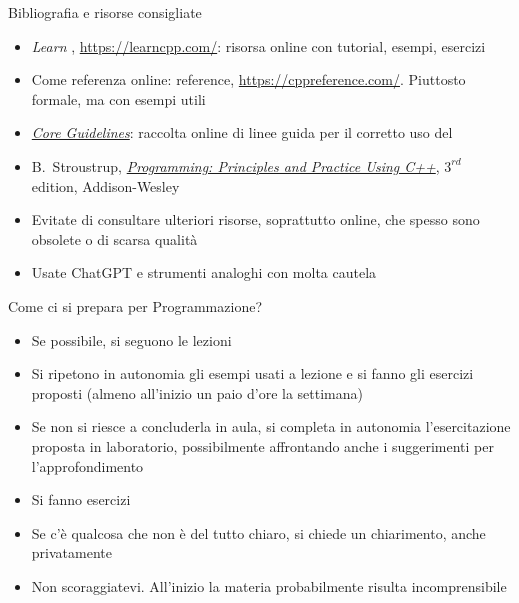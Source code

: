 \begin{frame}{Bibliografia e risorse consigliate}

  \begin{itemize}

  \item \textit{Learn \Cpp{}}, \url{https://learncpp.com/}: risorsa online con
    tutorial, esempi, esercizi

  \item Come referenza online: \Cpp{} reference,
    \url{https://cppreference.com/}. Piuttosto formale, ma con esempi utili

  \item
    \href{https://isocpp.github.io/CppCoreGuidelines/CppCoreGuidelines}{\textit{\Cpp{}
        Core Guidelines}}: raccolta online di linee guida per il corretto uso
    del \Cpp{}

  \item B.~Stroustrup,
    \href{https://stroustrup.com/programming.html}{\textit{Programming:
        Principles and Practice Using C++}}, $3^{rd}$ edition, Addison-Wesley

  \end{itemize}

  \begin{itemize}
  \item Evitate di consultare ulteriori risorse, soprattutto online, che spesso
    sono obsolete o di scarsa qualità
  \item Usate ChatGPT e strumenti analoghi con molta cautela
  \end{itemize}

\end{frame}

\begin{frame}{Come ci si prepara per Programmazione?}

  \begin{itemize}
  \item Se possibile, si seguono le lezioni
  \item Si ripetono in autonomia gli esempi usati a lezione e si fanno gli
    esercizi proposti (almeno all'inizio un paio d'ore la settimana)
  \item Se non si riesce a concluderla in aula, si completa in
    autonomia l'esercitazione proposta in laboratorio, possibilmente
    affrontando anche i suggerimenti per l'approfondimento
  \item Si fanno esercizi
  \item Se c'è qualcosa che non è del tutto chiaro, si chiede un
    chiarimento, anche privatamente
  \item Non scoraggiatevi. All'inizio la materia probabilmente risulta
    incomprensibile
  \end{itemize}

\end{frame}

